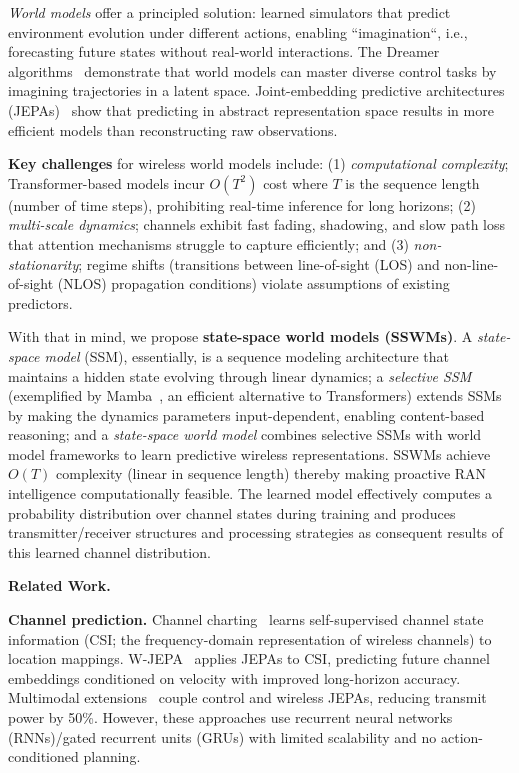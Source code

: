 \documentclass[11pt,a4paper]{article}
\begin{document}
\emph{World models} offer a principled solution: learned simulators that predict environment evolution under different actions, enabling ``imagination``, i.e., forecasting future states without real-world interactions. The Dreamer algorithms~\cite{hafner2023mastering} demonstrate that world models can master diverse control tasks by imagining trajectories in a latent space. Joint-embedding predictive architectures (JEPAs)~\cite{assran2023self} show that predicting in abstract representation space results in more efficient models than reconstructing raw observations.

\textbf{Key challenges} for wireless world models include: (1) \emph{computational complexity}; Transformer-based models incur $O(T^2)$ cost where $T$ is the sequence length (number of time steps), prohibiting real-time inference for long horizons; (2) \emph{multi-scale dynamics}; channels exhibit fast fading, shadowing, and slow path loss that attention mechanisms struggle to capture efficiently; and (3) \emph{non-stationarity}; regime shifts (transitions between line-of-sight (LOS) and non-line-of-sight (NLOS) propagation conditions) violate assumptions of existing predictors.

With that in mind, we propose \textbf{state-space world models (SSWMs)}. A \emph{state-space model} (SSM), essentially, is a sequence modeling architecture that maintains a hidden state evolving through linear dynamics; a \emph{selective SSM} (exemplified by Mamba~\cite{gu2024mamba}, an efficient alternative to Transformers) extends SSMs by making the dynamics parameters input-dependent, enabling content-based reasoning; and a \emph{state-space world model} combines selective SSMs with world model frameworks to learn predictive wireless representations. SSWMs achieve $O(T)$ complexity (linear in sequence length) thereby making proactive RAN intelligence computationally feasible. The learned model effectively computes a probability distribution over channel states during training and produces transmitter/receiver structures and processing strategies as consequent results of this learned channel distribution.

\vspace{1em}
\textbf{\textcolor{stanfordred}{\large Related Work.}}

\textbf{Channel prediction.} Channel charting~\cite{studer2018channel} learns self-supervised channel state information (CSI; the frequency-domain representation of wireless channels) to location mappings. W-JEPA~\cite{chaaya2024learning} applies JEPAs to CSI, predicting future channel embeddings conditioned on velocity with improved long-horizon accuracy. Multimodal extensions~\cite{chaaya2025pixels} couple control and wireless JEPAs, reducing transmit power by 50\%. However, these approaches use recurrent neural networks (RNNs)/gated recurrent units (GRUs) with limited scalability and no action-conditioned planning.
\end{document}
